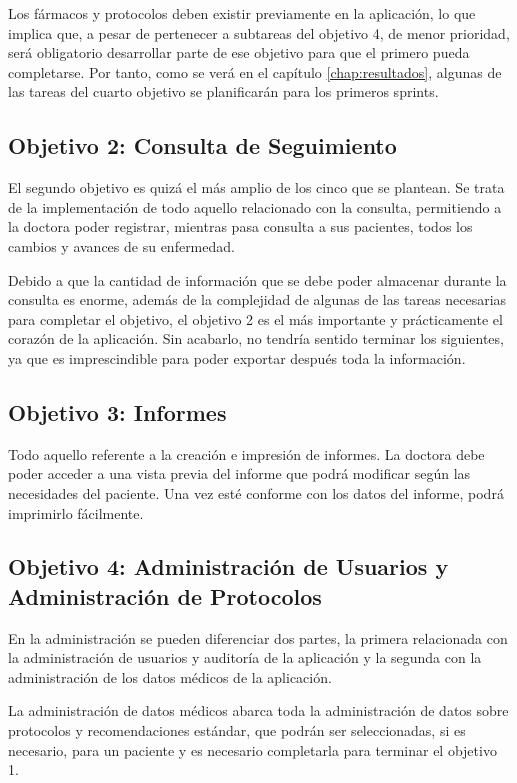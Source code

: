 Los fármacos y protocolos deben existir previamente en la aplicación, lo que implica que, a pesar de pertenecer a subtareas del objetivo 4, de menor prioridad, será obligatorio desarrollar parte de ese objetivo para que el primero pueda completarse. Por tanto, como se verá en el capítulo \ref{chap:resultados}, algunas de las tareas del cuarto objetivo se planificarán para los primeros sprints.

\subsection{Objetivo 2: Consulta de Seguimiento}

El segundo objetivo es quizá el más amplio de los cinco que se plantean. Se trata de la implementación de todo aquello relacionado con la consulta, permitiendo a la doctora poder registrar, mientras pasa consulta a sus pacientes, todos los cambios y avances de su enfermedad. 

Debido a que la cantidad de información que se debe poder almacenar durante la consulta es enorme, además de la complejidad de algunas de las tareas necesarias para completar el objetivo, el objetivo 2 es el más importante y prácticamente el corazón de la aplicación. Sin acabarlo, no tendría sentido terminar los siguientes, ya que es imprescindible para poder exportar después toda la información.

\subsection{Objetivo 3: Informes}

Todo aquello referente a la creación e impresión de informes. La doctora debe poder acceder a una vista previa del informe que podrá modificar según las necesidades del paciente. Una vez esté conforme con los datos del informe, podrá imprimirlo fácilmente.

\subsection{Objetivo 4: Administración de Usuarios y Administración de Protocolos}

En la administración se pueden diferenciar dos partes, la primera relacionada con la administración de usuarios y auditoría de la aplicación y la segunda con la administración de los datos médicos de la aplicación.

La administración de datos médicos abarca toda la administración de datos sobre protocolos y recomendaciones estándar, que podrán ser seleccionadas, si es necesario, para un paciente y es necesario completarla para terminar el objetivo 1. 

